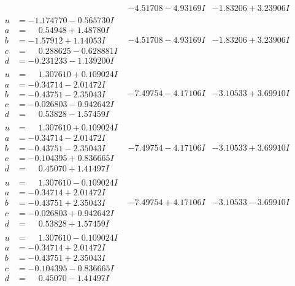 \documentclass[1p]{elsarticle_modified}
\theoremstyle{definition}
\begin{document}
$$\begin{array}{c|c|c}
 & -4.51708 - 4.93169 I & -1.83206 + 3.23906 I \\ \hline\begin{aligned}
u &= -1.174770 - 0.565730 I \\
a &= \phantom{-}0.54948 + 1.48780 I \\
b &= -1.57912 + 1.14053 I \\
c &= \phantom{-}0.288625 - 0.628881 I \\
d &= -0.231233 - 1.139200 I\end{aligned}
 & -4.51708 - 4.93169 I & -1.83206 + 3.23906 I \\ \hline\begin{aligned}
u &= \phantom{-}1.307610 + 0.109024 I \\
a &= -0.34714 - 2.01472 I \\
b &= -0.43751 - 2.35043 I \\
c &= -0.026803 - 0.942642 I \\
d &= \phantom{-}0.53828 - 1.57459 I\end{aligned}
 & -7.49754 - 4.17106 I & -3.10533 + 3.69910 I \\ \hline\begin{aligned}
u &= \phantom{-}1.307610 + 0.109024 I \\
a &= -0.34714 - 2.01472 I \\
b &= -0.43751 - 2.35043 I \\
c &= -0.104395 + 0.836665 I \\
d &= \phantom{-}0.45070 + 1.41497 I\end{aligned}
 & -7.49754 - 4.17106 I & -3.10533 + 3.69910 I \\ \hline\begin{aligned}
u &= \phantom{-}1.307610 - 0.109024 I \\
a &= -0.34714 + 2.01472 I \\
b &= -0.43751 + 2.35043 I \\
c &= -0.026803 + 0.942642 I \\
d &= \phantom{-}0.53828 + 1.57459 I\end{aligned}
 & -7.49754 + 4.17106 I & -3.10533 - 3.69910 I \\ \hline\begin{aligned}
u &= \phantom{-}1.307610 - 0.109024 I \\
a &= -0.34714 + 2.01472 I \\
b &= -0.43751 + 2.35043 I \\
c &= -0.104395 - 0.836665 I \\
d &= \phantom{-}0.45070 - 1.41497 I\end{aligned}

\end{array}$$
\end{document}
